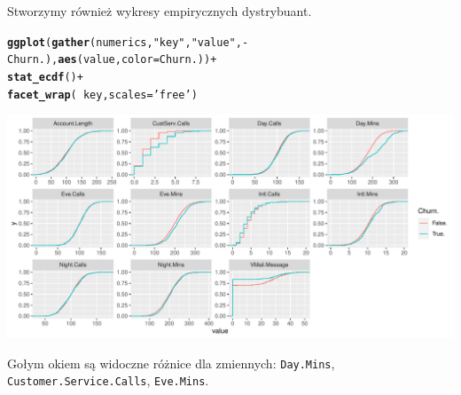 \documentclass{article}\usepackage[]{graphicx}\usepackage[]{color}
\makeatletter
\def\maxwidth{ %
  \ifdim\Gin@nat@width>\linewidth
    \linewidth
  \else
    \Gin@nat@width
  \fi
}
\newcommand{\hlstr}[1]{\textcolor[rgb]{0.192,0.494,0.8}{#1}}%
\newcommand{\hlopt}[1]{\textcolor[rgb]{0,0,0}{#1}}%
\newcommand{\hlstd}[1]{\textcolor[rgb]{0.345,0.345,0.345}{#1}}%
\newcommand{\hlkwc}[1]{\textcolor[rgb]{0.333,0.667,0.333}{#1}}%
\newcommand{\hlkwd}[1]{\textcolor[rgb]{0.737,0.353,0.396}{\textbf{#1}}}%
\newenvironment{kframe}{%
 \def\at@end@of@kframe{}%
 \ifinner\ifhmode%
  \def\at@end@of@kframe{\end{minipage}}%
  \begin{minipage}{\columnwidth}%
 \fi\fi%
 \def\FrameCommand##1{\hskip\@totalleftmargin \hskip-\fboxsep
 \colorbox{shadecolor}{##1}\hskip-\fboxsep
     \hskip-\linewidth \hskip-\@totalleftmargin \hskip\columnwidth}%
 \MakeFramed {\advance\hsize-\width
   \@totalleftmargin\z@ \linewidth\hsize
   \@setminipage}}%
 {\par\unskip\endMakeFramed%
 \at@end@of@kframe}
\newenvironment{knitrout}{}{} %
\makeatother
\begin{document}
Stworzymy również wykresy empirycznych dystrybuant.
\begin{knitrout}
\color{fgcolor}\begin{kframe}
\begin{alltt}
\hlkwd{ggplot}\hlstd{(}\hlkwd{gather}\hlstd{(numerics,} \hlstr{"key"}\hlstd{,} \hlstr{"value"}\hlstd{,} \hlopt{-}\hlstd{Churn.),} \hlkwd{aes}\hlstd{(value,} \hlkwc{color}\hlstd{=Churn.))} \hlopt{+}
  \hlkwd{stat_ecdf}\hlstd{()} \hlopt{+}
  \hlkwd{facet_wrap}\hlstd{(}\hlopt{~}\hlstd{key,} \hlkwc{scales}\hlstd{=}\hlstr{'free'}\hlstd{)}
\end{alltt}
\end{kframe}

{\centering \includegraphics[width=\maxwidth]{figure/Dystrybuanty_empiryczne-1} 

}



\end{knitrout}

Gołym okiem są widoczne różnice dla zmiennych: \verb|Day.Mins|, \verb|Customer.Service.Calls|, \verb|Eve.Mins|.
\end{document}
